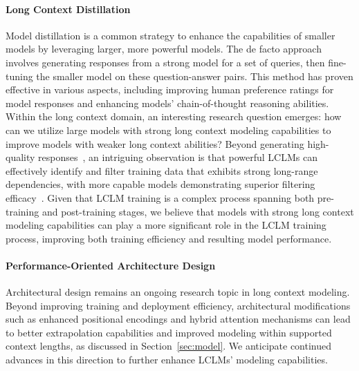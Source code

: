 \documentclass[11pt, a4paper, logo, copyright, nonumbering]{map}
\begin{document}
\paragraph{Long Context Distillation} Model distillation is a common strategy to enhance the capabilities of smaller models by leveraging larger, more powerful models. The de facto approach involves generating responses from a strong model for a set of queries, then fine-tuning the smaller model on these question-answer pairs. This method has proven effective in various aspects, including improving human preference ratings for model responses and enhancing models' chain-of-thought reasoning abilities. Within the long context domain, an interesting research question emerges: how can we utilize large models with strong long context modeling capabilities to improve models with weaker long context abilities? Beyond generating high-quality responses~\citep{longalign}, an intriguing observation is that powerful LCLMs can effectively identify and filter training data that exhibits strong long-range dependencies, with more capable models demonstrating superior filtering efficacy~\citep{wu2025longattn}. Given that LCLM training is a complex process spanning both pre-training and post-training stages, we believe that models with strong long context modeling capabilities can play a more significant role in the LCLM training process, improving both training efficiency and resulting model performance.

\paragraph{Performance-Oriented Architecture Design} Architectural design remains an ongoing research topic in long context modeling. Beyond improving training and deployment efficiency, architectural modifications such as enhanced positional encodings and hybrid attention mechanisms can lead to better extrapolation capabilities and improved modeling within supported context lengths, as discussed in Section~\ref{sec:model}. We anticipate continued advances in this direction to further enhance LCLMs' modeling capabilities.
\end{document}
